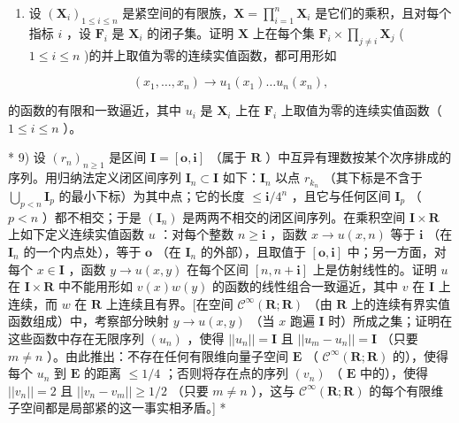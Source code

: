 \begin{enumerate}
\def\labelenumi{\arabic{enumi})}
\setcounter{enumi}{7}
\tightlist
\item
  设 \((\mathbf{X}_i)_{1\leqslant i\leqslant n}\) 是紧空间的有限族，\(\mathbf{X} = \prod_{i=1}^{n}\mathbf{X}_i\) 是它们的乘积，且对每个指标 \(i\) ，设 \(\mathbf{F}_i\) 是 \(\mathbf{X}_i\) 的闭子集。证明 \(\mathbf{X}\) 上在每个集 \(\mathbf{F}_i\times \prod_{j\neq i}\mathbf{X}_j\) ( \(1\leqslant i\leqslant n\) )的并上取值为零的连续实值函数，都可用形如
\end{enumerate}

\[
(x _ {1}, \dots , x _ {n}) \rightarrow u _ {1} (x _ {1}) \dots u _ {n} (x _ {n}),
\]

的函数的有限和一致逼近，其中 \(u_{i}\) 是 \(\mathbf{X}_i\) 上在 \(\mathbf{F}_i\) 上取值为零的连续实值函数（ \(1 \leqslant i \leqslant n\) ）。

* 9) 设 \((r_n)_{n \geqslant 1}\) 是区间 \(\mathbf{I} = [\mathbf{o}, \mathbf{i}]\) （属于 \(\mathbf{R}\) ）中互异有理数按某个次序排成的序列。用归纳法定义闭区间序列 \(\mathbf{I}_n \subset \mathbf{I}\) 如下：\(\mathbf{I}_n\) 以点 \(r_{k_n}\) （其下标是不含于 \(\bigcup_{p < n} \mathbf{I}_p\) 的最小下标）为其中点；它的长度 \(\leqslant \mathbf{i}/4^n\) ，且它与任何区间 \(\mathbf{I}_p\) （ \(p < n\) ）都不相交；于是 \((\mathbf{I}_n)\) 是两两不相交的闭区间序列。在乘积空间 \(\mathbf{I} \times \mathbf{R}\) 上如下定义连续实值函数 \(u\) ：对每个整数 \(n \geqslant \mathbf{i}\) ，函数 \(x \to u(x, n)\) 等于 \(\mathbf{i}\) （在 \(\mathbf{I}_n\) 的一个内点处），等于 \(\mathbf{o}\) （在 \(\mathbf{I}_n\) 的外部），且取值于 \([\mathbf{o}, \mathbf{i}]\) 中；另一方面，对每个 \(x \in \mathbf{I}\) ，函数 \(y \to u(x, y)\) 在每个区间 \([n, n + \mathbf{i}]\) 上是仿射线性的。证明 \(u\) 在 \(\mathbf{I} \times \mathbf{R}\) 中不能用形如 \(v(x)w(y)\) 的函数的线性组合一致逼近，其中 \(v\) 在 \(\mathbf{I}\) 上连续，而 \(w\) 在 \(\mathbf{R}\) 上连续且有界。{[}在空间 \(\mathcal{C}^\infty(\mathbf{R}; \mathbf{R})\) （由 \(\mathbf{R}\) 上的连续有界实值函数组成）中，考察部分映射 \(y \to u(x, y)\) （当 \(x\) 跑遍 \(\mathbf{I}\) 时）所成之集；证明在这些函数中存在无限序列 \((u_n)\) ，使得 \(||u_n|| = \mathbf{I}\) 且 \(||u_m - u_n|| = \mathbf{I}\) （只要 \(m \neq n\) ）。由此推出：不存在任何有限维向量子空间 \(\mathbf{E}\) （ \(\mathcal{C}^\infty(\mathbf{R}; \mathbf{R})\) 的），使得每个 \(u_n\) 到 \(\mathbf{E}\) 的距离 \(\leqslant 1/4\) ；否则将存在点的序列 \((v_n)\) （ \(\mathbf{E}\) 中的），使得 \(||v_n|| = 2\) 且 \(||v_n - v_m|| \geqslant 1/2\) （只要 \(m \neq n\) ），这与 \(\mathcal{C}^\infty(\mathbf{R}; \mathbf{R})\) 的每个有限维子空间都是局部紧的这一事实相矛盾。{]} *

